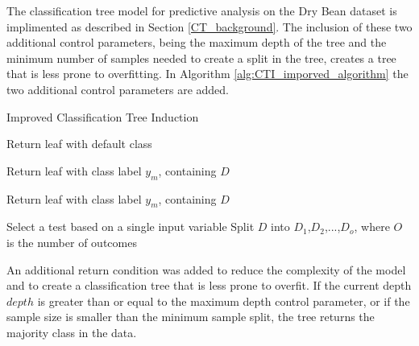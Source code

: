 \documentclass[10pt, conference]{IEEEtran}
\begin{document}
The classification tree model for predictive analysis on the Dry Bean dataset is implimented as described
in Section \ref{CT_background}. The inclusion of these two additional control parameters, being the maximum depth of the tree
and the minimum number of samples needed to create a split in the tree, creates a tree that is less prone to
overfitting. In Algorithm \ref{alg:CTI_imporved_algorithm} the two additional control parameters are added.
\begin{algorithm}[H]
    \caption{Improved Classification Tree Induction}
    \label{alg:CTI_imporved_algorithm}
    \begin{algorithmic}[1]
                \State Return leaf with default class
            \EndIf
            
                \State Return leaf with class label $y_m$, containing $D$
            \EndIf

                \State Return leaf with class label $y_m$, containing $D$
            \EndIf

            \State Select a test based on a single input variable
            \State Split $D$ into $D_1$,$D_2$,...,$D_o$, where $O$ is the number of outcomes
                \State {}
            \EndFor
        \EndFunction
    \end{algorithmic}
\end{algorithm}

An additional return condition was added to reduce the complexity of the model and to create a
classification tree that is less prone to overfit. If the current depth $depth$
is greater than or equal to the maximum depth control parameter, or if the sample size is smaller
than the minimum sample split, the tree returns the majority class in the data.
\end{document}
